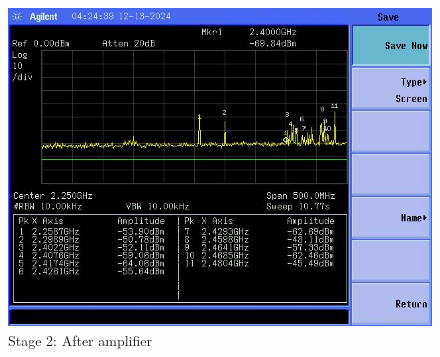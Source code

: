 \documentclass[letterpaper,12pt]{article}
\begin{document}
\begin{figure}[H]
	\begin{centering}
		\includegraphics[width=0.5\columnwidth]{figures/receiver_spectra/2.amp}
		\caption{Stage 2: After amplifier}
	\end{centering}
\end{figure}
\end{document}
